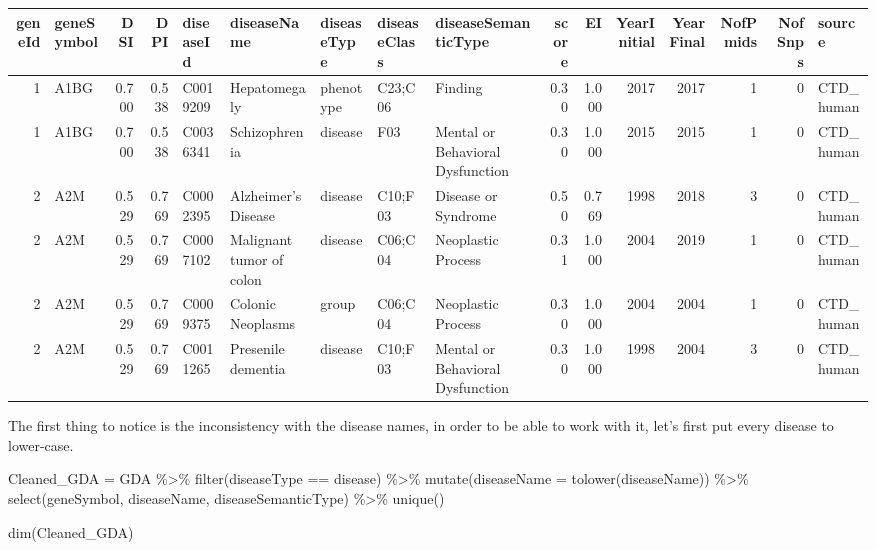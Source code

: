 \documentclass[
]{book}
\newenvironment{Shaded}{\begin{snugshade}}{\end{snugshade}}
\newcommand{\AttributeTok}[1]{\textcolor[rgb]{0.77,0.63,0.00}{#1}}
\newcommand{\FunctionTok}[1]{\textcolor[rgb]{0.00,0.00,0.00}{#1}}
\newcommand{\NormalTok}[1]{#1}
\newcommand{\OtherTok}[1]{\textcolor[rgb]{0.56,0.35,0.01}{#1}}
\newcommand{\SpecialCharTok}[1]{\textcolor[rgb]{0.00,0.00,0.00}{#1}}
\newcommand{\StringTok}[1]{\textcolor[rgb]{0.31,0.60,0.02}{#1}}
\begin{document}
\begin{table}[H]
\centering
\begin{tabular}[t]{r|l|r|r|l|l|l|l|l|r|r|r|r|r|r|l}
\hline
geneId & geneSymbol & DSI & DPI & diseaseId & diseaseName & diseaseType & diseaseClass & diseaseSemanticType & score & EI & YearInitial & YearFinal & NofPmids & NofSnps & source\\
\hline
1 & A1BG & 0.700 & 0.538 & C0019209 & Hepatomegaly & phenotype & C23;C06 & Finding & 0.30 & 1.000 & 2017 & 2017 & 1 & 0 & CTD\_human\\
\hline
1 & A1BG & 0.700 & 0.538 & C0036341 & Schizophrenia & disease & F03 & Mental or Behavioral Dysfunction & 0.30 & 1.000 & 2015 & 2015 & 1 & 0 & CTD\_human\\
\hline
2 & A2M & 0.529 & 0.769 & C0002395 & Alzheimer's Disease & disease & C10;F03 & Disease or Syndrome & 0.50 & 0.769 & 1998 & 2018 & 3 & 0 & CTD\_human\\
\hline
2 & A2M & 0.529 & 0.769 & C0007102 & Malignant tumor of colon & disease & C06;C04 & Neoplastic Process & 0.31 & 1.000 & 2004 & 2019 & 1 & 0 & CTD\_human\\
\hline
2 & A2M & 0.529 & 0.769 & C0009375 & Colonic Neoplasms & group & C06;C04 & Neoplastic Process & 0.30 & 1.000 & 2004 & 2004 & 1 & 0 & CTD\_human\\
\hline
2 & A2M & 0.529 & 0.769 & C0011265 & Presenile dementia & disease & C10;F03 & Mental or Behavioral Dysfunction & 0.30 & 1.000 & 1998 & 2004 & 3 & 0 & CTD\_human\\
\hline
\end{tabular}
\end{table}

The first thing to notice is the inconsistency with the disease names, in order to be able to work with it, let's first put every disease to lower-case.

\begin{Shaded}
\begin{Highlighting}[]
\NormalTok{Cleaned\_GDA }\OtherTok{=}\NormalTok{ GDA }\SpecialCharTok{\%\textgreater{}\%} \FunctionTok{filter}\NormalTok{(diseaseType }\SpecialCharTok{==} \StringTok{\textquotesingle{}disease\textquotesingle{}}\NormalTok{) }\SpecialCharTok{\%\textgreater{}\%}
  \FunctionTok{mutate}\NormalTok{(}\AttributeTok{diseaseName =} \FunctionTok{tolower}\NormalTok{(diseaseName)) }\SpecialCharTok{\%\textgreater{}\%}
  \FunctionTok{select}\NormalTok{(geneSymbol, diseaseName, diseaseSemanticType) }\SpecialCharTok{\%\textgreater{}\%}
  \FunctionTok{unique}\NormalTok{() }

\FunctionTok{dim}\NormalTok{(Cleaned\_GDA)}
\end{Highlighting}
\end{Shaded}
\end{document}
